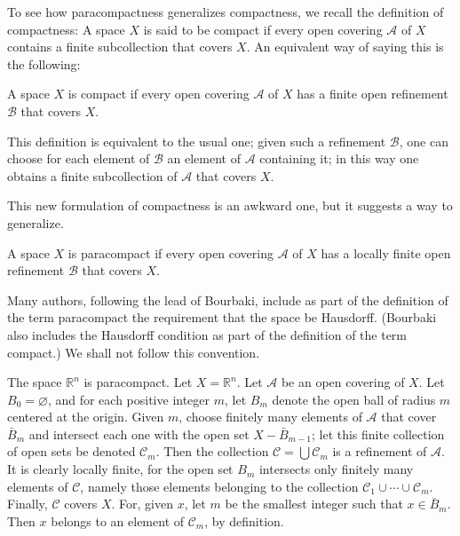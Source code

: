 To see how paracompactness generalizes compactness, we recall the definition of compactness: A space \(X\) is said to be compact if every open covering \(\mathcal{A}\) of \(X\) contains a finite subcollection that covers \(X\). An equivalent way of saying this is the following:

A space \(X\) is compact if every open covering \(\mathcal{A}\) of \(X\) has a finite open refinement \(\mathcal{B}\) that covers \(X\).

This definition is equivalent to the usual one; given such a refinement \(\mathcal{B}\), one can choose for each element of \(\mathcal{B}\) an element of \(\mathcal{A}\) containing it; in this way one obtains a finite subcollection of \(\mathcal{A}\) that covers \(X\).

This new formulation of compactness is an awkward one, but it suggests a way to generalize.

\begin{definition}
 A space \(X\) is paracompact if every open covering \(\mathcal{A}\) of \(X\) has a locally finite open refinement \(\mathcal{B}\) that covers \(X\).
\end{definition}

Many authors, following the lead of Bourbaki, include as part of the definition of the term paracompact the requirement that the space be Hausdorff. (Bourbaki also includes the Hausdorff condition as part of the definition of the term compact.) We shall not follow this convention.

\begin{centeredblock}
\begin{example}
\label{ex:\thesection.\theexample}
 The space \(\mathbb{R}^{n}\) is paracompact. Let \(X = \mathbb{R}^{n}\). Let \(\mathcal{A}\) be an open covering of \(X\). Let \(B_{0} = \varnothing\), and for each positive integer \(m\), let \(B_{m}\) denote the open ball of radius \(m\) centered at the origin. Given \(m\), choose finitely many elements of \(\mathcal{A}\) that cover \(\bar{B}_{m}\) and intersect each one with the open set \(X - \bar{B}_{m - 1}\); let this finite collection of open sets be denoted \(\mathcal{C}_{m}\). Then the collection \(\mathcal{C} = \bigcup {\mathcal{C}}_{m}\) is a refinement of \(\mathcal{A}\). It is clearly locally finite, for the open set \(B_{m}\) intersects only finitely many elements of \(\mathcal{C}\), namely those elements belonging to the collection \(\mathcal{C}_{1} \cup \cdots \cup {\mathcal{C}}_{m}\). Finally, \(\mathcal{C}\) covers \(X\). For, given \(x\), let \(m\) be the smallest integer such that \(x \in {\bar{B}}_{m}\). Then \(x\) belongs to an element of \(\mathcal{C}_{m}\), by definition.
\end{example}
\end{centeredblock}

